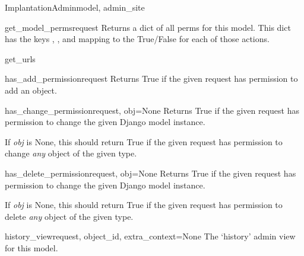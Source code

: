 \documentclass[letterpaper,10pt,english]{sphinxmanual}
\begin{document}
\begin{classdesc}{ImplantationAdmin}{model, admin\_site}
\hypertarget{data.admin.ImplantationAdmin.get_model_perms}{}\begin{methoddesc}{get\_model\_perms}{request}
Returns a dict of all perms for this model. This dict has the keys
, , and  mapping to the True/False for each
of those actions.
\end{methoddesc}

\hypertarget{data.admin.ImplantationAdmin.get_urls}{}\begin{methoddesc}{get\_urls}{}\end{methoddesc}

\hypertarget{data.admin.ImplantationAdmin.has_add_permission}{}\begin{methoddesc}{has\_add\_permission}{request}
Returns True if the given request has permission to add an object.
\end{methoddesc}

\hypertarget{data.admin.ImplantationAdmin.has_change_permission}{}\begin{methoddesc}{has\_change\_permission}{request, obj=None}
Returns True if the given request has permission to change the given
Django model instance.

If \emph{obj} is None, this should return True if the given request has
permission to change \emph{any} object of the given type.
\end{methoddesc}

\hypertarget{data.admin.ImplantationAdmin.has_delete_permission}{}\begin{methoddesc}{has\_delete\_permission}{request, obj=None}
Returns True if the given request has permission to change the given
Django model instance.

If \emph{obj} is None, this should return True if the given request has
permission to delete \emph{any} object of the given type.
\end{methoddesc}

\hypertarget{data.admin.ImplantationAdmin.history_view}{}\begin{methoddesc}{history\_view}{request, object\_id, extra\_context=None}
The `history' admin view for this model.
\end{methoddesc}


\end{classdesc}
\end{document}
